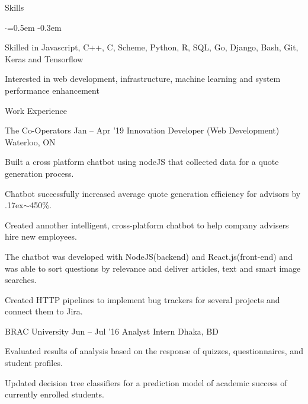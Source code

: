 \documentclass{resume} %
\begin{document}

\begin{rSection}{Skills}
  \vspace {0.3em}
  \begin{list}{$\cdot$}{\leftmargin=0.5em}
    \itemsep -0.3em \vspace{-0.3em}
    \item Skilled in Javascript, C++, C, Scheme, Python, R, SQL, Go, Django, Bash, Git, Keras and Tensorflow
    \item Interested in web development, infrastructure, machine learning and system performance enhancement
  \end{list}
  \vspace{0.3em}
\end{rSection}



\begin{rSection}{Work Experience}
  \begin{rSubsection}{The Co-Operators}
    {Jan -- Apr '19}
         {Innovation Developer (Web Development)}
         {Waterloo, ON}
       \item Built a cross platform chatbot using nodeJS that collected data for a quote generation process.
       \item Chatbot successfully increased average quote generation efficiency for advisors by {\raise.17ex\hbox{$\scriptstyle\mathtt{\sim}$}}450\%.
    \item Created annother intelligent, cross-platform chatbot to help company advisers hire new employees. 
    \item The chatbot was developed with NodeJS(backend) and React.js(front-end) and was able to sort questions by relevance and deliver articles, text and smart image searches.
     \item Created HTTP pipelines to implement bug trackers for several projects and connect them to Jira.
  \end{rSubsection}

	\begin{rSubsection}{BRAC University}
		{Jun -- Jul '16}
		{Analyst Intern}
		{Dhaka, BD}
		\item Evaluated results of analysis based on the response of quizzes, questionnaires, and student profiles. 
		\item Updated decision tree classifiers for a prediction model of academic success of currently enrolled students.
	\end{rSubsection}

  
\end{rSection} 
\end{document}

